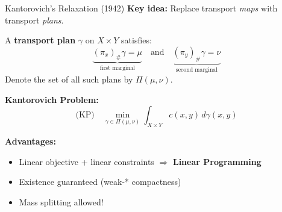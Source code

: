 \documentclass[aspectratio=169]{beamer}
\begin{document}
\begin{frame}{Kantorovich's Relaxation (1942)}
\textbf{Key idea:} Replace transport \emph{maps} with transport \emph{plans}.

\vspace{0.3cm}
A \textbf{transport plan} $\gamma$ on $X \times Y$ satisfies:
\[
\underbrace{(\pi_x)_\#\gamma = \mu}_{\text{first marginal}} \quad \text{and} \quad \underbrace{(\pi_y)_\#\gamma = \nu}_{\text{second marginal}}
\]
Denote the set of all such plans by $\Pi(\mu, \nu)$.

\vspace{0.3cm}
\textbf{Kantorovich Problem:}
\[
\text{(KP)} \quad \min_{\gamma \in \Pi(\mu,\nu)} \int_{X \times Y} c(x,y) \, d\gamma(x,y)
\]

\vspace{0.3cm}
\textbf{Advantages:}
\begin{itemize}
    \item Linear objective + linear constraints $\Rightarrow$ \textbf{Linear Programming}
    \item Existence guaranteed (weak-* compactness)
    \item Mass splitting allowed!
\end{itemize}
\end{frame}
\end{document}
